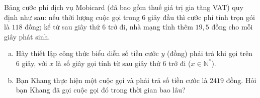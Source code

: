 \begin{bt}%
Bảng cước phí dịch vụ Mobicard (đã bao gồm thuế giá trị gia tăng VAT) quy định như sau: nếu thời lượng cuộc gọi trong $6$ giây đầu thì cước phí tính trọn gói là $118$ đồng; kể từ sau giây thứ $6$ trở đi, nhà mạng tính thêm $19{,}5$ đồng cho mỗi giây phát sinh.
\begin{enumerate}[a)]
	\item Hãy thiết lập công thức biểu diễn số tiền cước $y$ (đồng) phải trả khi gọi trên $6$ giây, với $x$ là số giây gọi tính từ sau giây thứ $6$ trở đi ($x \in \mathbb{N}^*$).
	\item Bạn Khang thực hiện một cuộc gọi và phải trả số tiền cước là $2419$ đồng. Hỏi bạn Khang đã gọi cuộc gọi đó trong thời gian bao lâu?
\end{enumerate}
\end{bt}

